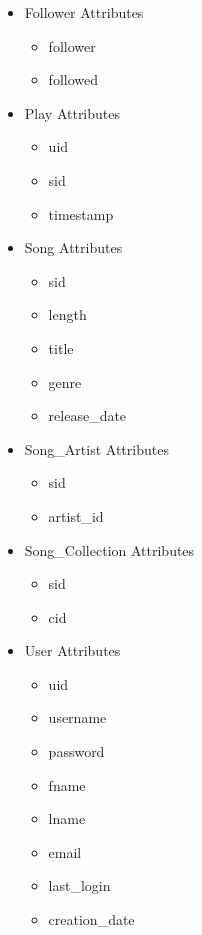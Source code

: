 \documentclass[12pt]{article}
\begin{document}
\begin{itemize}
        \item Follower Attributes
            \begin{itemize}
                \item follower
                \item followed
            \end{itemize}
        \item Play Attributes
            \begin{itemize}
                \item uid
                \item sid
                \item timestamp
            \end{itemize}
        \item Song Attributes
            \begin{itemize}
                \item sid
                \item length
                \item title
                \item genre
                \item release\_date
            \end{itemize}
        \item Song\_Artist Attributes
            \begin{itemize}
                \item sid
                \item artist\_id
            \end{itemize}
        \item Song\_Collection Attributes
            \begin{itemize}
                \item sid
                \item cid
            \end{itemize}
        \item User Attributes
        \begin{itemize}
            \item uid
            \item username
            \item password
            \item fname
            \item lname
            \item email
            \item last\_login
            \item creation\_date
        \end{itemize}
    \end{itemize}
\end{document}
